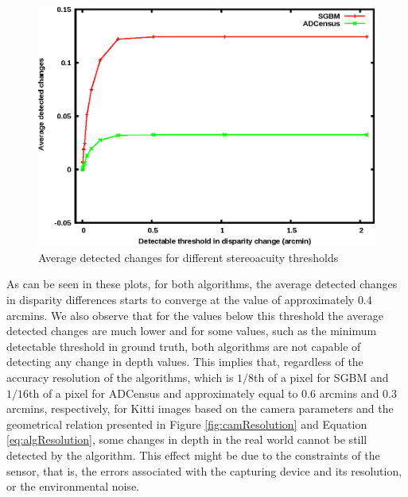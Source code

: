 \begin{figure}[H]
\centering
\includegraphics{algthreshBoth}
\caption{Average detected changes for different stereoacuity thresholds}
\label{fig:algthresh}
\end{figure} 

As can be seen in these plots, for both algorithms, the average detected changes in disparity differences starts to converge at the value of approximately $0.4$ arcmins.
We also observe that for the values below this threshold the average detected changes are much lower and for some values, such as the minimum detectable threshold in ground truth,
both algorithms are not capable of detecting any change in depth values. 
This implies that, regardless of the accuracy resolution of the algorithms, which is $1/8$th of a pixel for SGBM and $1/16$th of a pixel for ADCensus and approximately equal to
$0.6$ arcmins and $0.3$ arcmins, respectively, for Kitti images based on the camera parameters and the geometrical relation presented in Figure \ref{fig:camResolution} and 
Equation \ref{eq:algResolution}, some changes in 
depth in the real world cannot be still detected by the algorithm. This effect might be due to the constraints of the sensor, that is, the errors associated with the capturing 
device and its resolution, or the environmental noise. 

